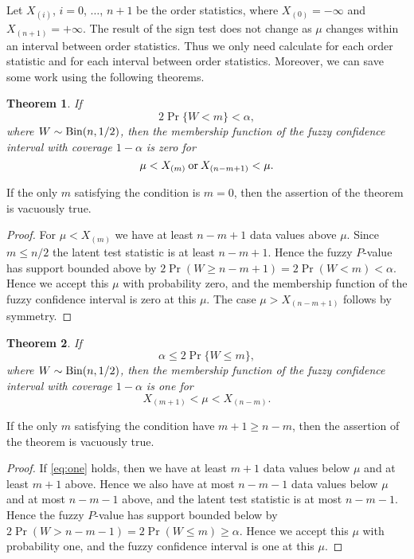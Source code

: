 \documentclass{article}
\newcommand{\BinomialDis}{\text{\upshape Bin}}
\newcommand{\opor}{\mathbin{\rm or}}
\newtheorem{theorem}{Theorem}
\begin{document}
Let $X_{(i)}$, $i = 0$, $\ldots$, $n + 1$ be the order statistics,
where $X_{(0)} = - \infty$ and $X_{(n + 1)} = + \infty$.
The result of the sign test does not change as $\mu$ changes within an
interval between order statistics.  Thus we only need calculate for each
order statistic and for each interval between order statistics.
Moreover, we can save some work using the following theorems.
\begin{theorem} \label{th:zero}
If
$$
   2 \Pr \{ W < m \} < \alpha,
$$
where $W \sim \BinomialDis(n, 1 / 2)$, then the membership function of
the fuzzy confidence interval with coverage $1 - \alpha$ is zero for
$$
   \mu < X_{(m)} \opor X_{(n - m + 1)} < \mu.
$$
\end{theorem}
If the only $m$ satisfying the condition is $m = 0$, then the assertion
of the theorem is vacuously true.
\begin{proof}
For $\mu < X_{(m)}$
we have at least $n - m + 1$ data values above $\mu$.
Since $m \le n / 2$ the latent test
statistic is at least $n - m + 1$.
Hence the fuzzy $P$-value has support
bounded above by $2 \Pr(W \ge n - m + 1) = 2 \Pr(W < m) < \alpha$.
Hence we accept this $\mu$ with probability zero,
and the membership function of the fuzzy confidence interval is zero
at this $\mu$.
The case $\mu > X_{(n - m + 1)}$ follows by symmetry.
\end{proof}

\begin{theorem} \label{th:one}
If
$$
   \alpha \le 2 \Pr \{ W \le m \},
$$
where $W \sim \BinomialDis(n, 1 / 2)$,
then the membership function of
the fuzzy confidence interval with coverage $1 - \alpha$ is one for
\begin{equation} \label{eq:one}
   X_{(m + 1)} < \mu < X_{(n - m)}.
\end{equation}
\end{theorem}
If the only $m$ satisfying the condition have $m + 1 \ge n - m$,
then the assertion of the theorem is vacuously true.
\begin{proof}
If \eqref{eq:one} holds, then
we have at least $m + 1$ data values below $\mu$ and at least $m + 1$ above.
Hence we also have at most $n - m - 1$ data values below $\mu$ and at most
$n - m - 1$ above, and the latent test statistic is at most $n - m - 1$.
Hence the fuzzy $P$-value has support
bounded below by $2 \Pr(W > n - m - 1) = 2 \Pr(W \le m) \ge \alpha$.
Hence we accept this $\mu$ with probability one,
and the fuzzy confidence interval is one at this $\mu$.
\end{proof}
\end{document}
